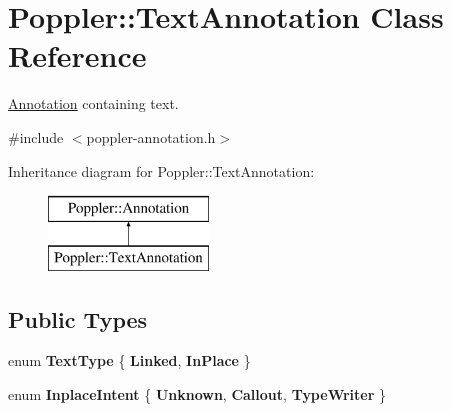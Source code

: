 \hypertarget{class_poppler_1_1_text_annotation}{}\section{Poppler\+:\+:Text\+Annotation Class Reference}
\label{class_poppler_1_1_text_annotation}


\hyperlink{class_poppler_1_1_annotation}{Annotation} containing text.  




{\ttfamily \#include $<$poppler-\/annotation.\+h$>$}

Inheritance diagram for Poppler\+:\+:Text\+Annotation\+:\begin{figure}[H]
\begin{center}
\leavevmode
\includegraphics[height=2.000000cm]{class_poppler_1_1_text_annotation}
\end{center}
\end{figure}
\subsection*{Public Types}
\begin{DoxyCompactItemize}
\item 
\mbox{\label{class_poppler_1_1_text_annotation_a3d104270179530ba8b6a000df9b299b9}} 
enum {\bfseries Text\+Type} \{ {\bfseries Linked}, 
{\bfseries In\+Place}
 \}
\item 
\mbox{\label{class_poppler_1_1_text_annotation_a15586f5de39f2c0f4d5b44f31ed1eaf0}} 
enum {\bfseries Inplace\+Intent} \{ {\bfseries Unknown}, 
{\bfseries Callout}, 
{\bfseries Type\+Writer}
 \}
\end{DoxyCompactItemize}
